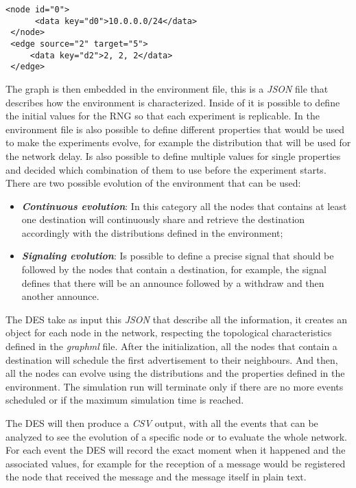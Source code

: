 \begin{lstlisting}[language=graphml, caption=Graph example, label=lst:graph_example]
 <node id="0">
      <data key="d0">10.0.0.0/24</data>
 </node>
 <edge source="2" target="5">
     <data key="d2">2, 2, 2</data>
 </edge>
\end{lstlisting}

The graph is then embedded in the environment file, this is a \textit{JSON} file
that describes how the environment is characterized.
Inside of it is possible to define the initial values for the \ac{RNG} so
that each experiment is replicable.
In the environment file is also possible to define different properties that
would be used to make the experiments evolve, for example the distribution that
will be used for the network delay.
Is also possible to define multiple values for single properties and decided which
combination of them to use before the experiment starts.
There are two possible evolution of the environment that can be used:
\begin{itemize}
    \item \textbf{\textit{Continuous evolution}}: In this category all the nodes
    that contains at least one destination will continuously share and retrieve
    the destination accordingly with the distributions defined in the environment;
    \item \textbf{\textit{Signaling evolution}}: Is possible to define a precise
    signal that should be followed by the nodes that contain a destination, for
    example, the signal  defines that there will be an announce followed by
    a withdraw and then another announce.
\end{itemize}

The \ac{DES} take as input this \textit{JSON} that describe all the information,
it creates an object for each node in the network, respecting
the topological characteristics defined in the \textit{graphml} file.
After the initialization, all the nodes that contain a destination will schedule
the first advertisement to their neighbours.
And then, all the nodes can evolve using the distributions and the properties
defined in the environment.
The simulation run will terminate only if there are no more events scheduled or
if the maximum simulation time is reached.

The \ac{DES} will then produce a \textit{CSV} output, with all the events that
can be analyzed to see the evolution of a specific node or to evaluate the
whole network.
For each event the \ac{DES} will record the exact moment when it happened and
the associated values, for example for the reception of a message would be registered
the node that received the message and the message itself in plain text.

